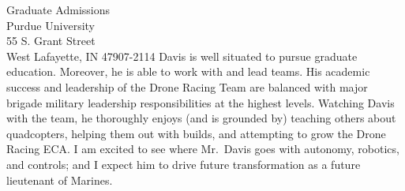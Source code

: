 \documentclass[10pt]{wrceletter}
\begin{document}
\begin{letter}{%
Graduate Admissions\\
Purdue University\\
55  S. Grant Street\\
West Lafayette, IN 47907-2114}
Davis is well situated to pursue graduate education. Moreover, he is able to work with and lead teams.  His academic success and leadership of the Drone Racing Team are balanced with major brigade military leadership responsibilities at the highest levels. Watching Davis with the team, he thoroughly enjoys (and is grounded by) teaching others about quadcopters, helping them out with builds, and attempting to grow the Drone Racing ECA.  I am excited to see where Mr.~Davis goes with autonomy, robotics, and controls; and I expect him to drive future transformation as a future lieutenant of Marines.

\closing{~} %

\end{letter}
\end{document}
